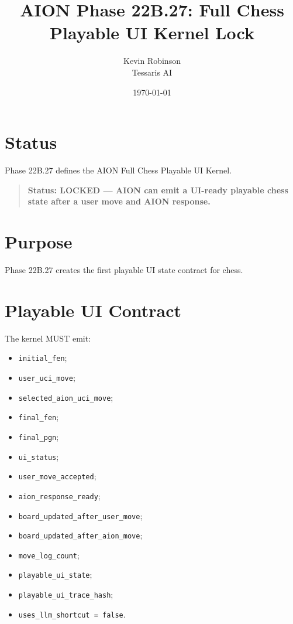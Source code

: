 \documentclass[11pt,a4paper]{article}
\title{\textbf{AION Phase 22B.27: Full Chess Playable UI Kernel Lock}}
\author{Kevin Robinson\\Tessaris AI}
\date{\today}
\begin{document}
\maketitle

\section{Status}

Phase 22B.27 defines the AION Full Chess Playable UI Kernel.

\begin{quote}
\textbf{Status: LOCKED --- AION can emit a UI-ready playable chess state after a user move and AION response.}
\end{quote}

\section{Purpose}

Phase 22B.27 creates the first playable UI state contract for chess.

\section{Playable UI Contract}

The kernel MUST emit:

\begin{itemize}
  \item \texttt{initial\_fen};
  \item \texttt{user\_uci\_move};
  \item \texttt{selected\_aion\_uci\_move};
  \item \texttt{final\_fen};
  \item \texttt{final\_pgn};
  \item \texttt{ui\_status};
  \item \texttt{user\_move\_accepted};
  \item \texttt{aion\_response\_ready};
  \item \texttt{board\_updated\_after\_user\_move};
  \item \texttt{board\_updated\_after\_aion\_move};
  \item \texttt{move\_log\_count};
  \item \texttt{playable\_ui\_state};
  \item \texttt{playable\_ui\_trace\_hash};
  \item \texttt{uses\_llm\_shortcut = false}.
\end{itemize}
\end{document}
